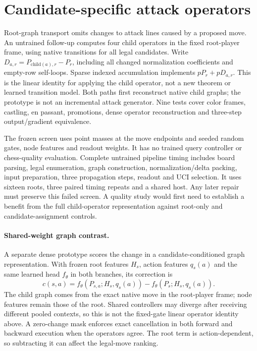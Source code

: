 \section{Candidate-specific attack operators}
Root-graph transport omits changes to attack lines caused by a proposed move.
An untrained follow-up computes four child operators in the fixed root-player
frame, using native transitions for all legal candidates. Write
$D_{a,r}=P_{\mathrm{child}(a),r}-P_r$, including all changed normalization
coefficients and empty-row self-loops. Sparse indexed accumulation implements
$pP_r+pD_{a,r}$. This is the linear identity for applying the child operator,
not a new theorem or learned transition model. Both paths first reconstruct
native child graphs; the prototype is not an incremental attack generator.
Nine tests cover color frames, castling, en passant, promotions, dense operator
reconstruction and three-step output/gradient equivalence.

The frozen screen uses point masses at the move endpoints and seeded random
gates, node features and readout weights. It has no trained query controller or
chess-quality evaluation. Complete untrained pipeline timing includes board
parsing, legal enumeration, graph construction, normalization/delta packing,
input preparation, three propagation steps, readout and UCI selection.
It uses sixteen roots, three paired timing repeats and a shared host.
\CounterfactualResults{}
Any later repair must preserve this failed screen. A quality study would first
need to establish a benefit from the full child-operator representation against
root-only and candidate-assignment controls.

\paragraph{Shared-weight graph contrast.}
A separate dense prototype scores the change in a candidate-conditioned graph
representation. With frozen root features $H_s$, action features $q_s(a)$ and
the same learned head $f_\theta$ in both branches, its correction is
\begin{equation}
 c(s,a)=f_\theta(P_{s,a};H_s,q_s(a))-f_\theta(P_s;H_s,q_s(a)).
\end{equation}
The child graph comes from the exact native move in the root-player frame;
node features remain those of the root. Shared controllers may diverge after
receiving different pooled contexts, so this is not the fixed-gate linear
operator identity above. A zero-change mask enforces exact cancellation in
both forward and backward execution when the operators agree. The root term
is action-dependent, so subtracting it can affect the legal-move ranking.

